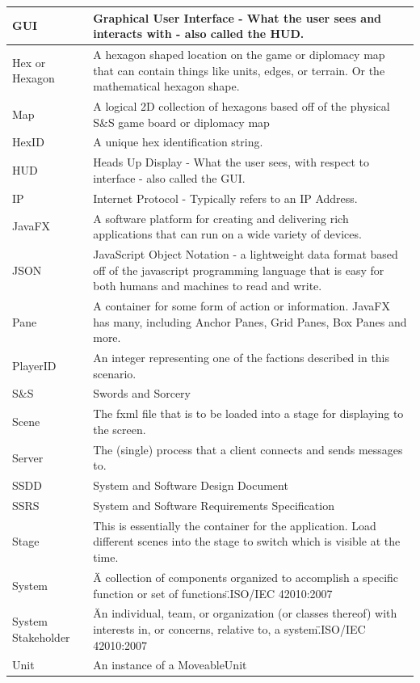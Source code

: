 \documentclass[12pt,a4paper,titlepage]{article}
\begin{document}
{\begin{center}
\begin{tabularx}{\linewidth}{|p{1.5in}|X|}
\hline
GUI & Graphical User Interface - What the user sees and interacts with - also called the HUD.\\
\hline
Hex or Hexagon & A hexagon shaped location on the game or diplomacy map that can contain things like units, edges, or terrain. Or the mathematical hexagon shape.\\
\hline
Map & A logical 2D collection of hexagons based off of the physical S\&S game board or diplomacy map\\
\hline
HexID & A unique hex identification string.\\
\hline
HUD & Heads Up Display - What the user sees, with respect to interface - also called the GUI.\\
\hline
IP & Internet Protocol - Typically refers to an IP Address.\\
\hline
JavaFX & A software platform for creating and delivering rich applications that can run on a wide variety of devices.\\
\hline
JSON & JavaScript Object Notation - a lightweight data format based off of the javascript programming language that is easy for both humans and machines to read and write.\\
\hline
Pane & A container for some form of action or information.  JavaFX has many, including Anchor Panes, Grid Panes, Box Panes and more.\\
\hline
PlayerID & An integer representing one of the factions described in this scenario.\\
\hline
S\&S & Swords and Sorcery\\
\hline
Scene & The fxml file that is to be loaded into a stage for displaying to the screen.\\
\hline
Server & The (single) process that a client connects and sends messages to. \\
\hline
SSDD & System and Software Design Document\\
\hline
SSRS & System and Software Requirements Specification\\
\hline
Stage & This is essentially the container for the application.  Load different scenes into the stage to switch which is visible at the time.\\
\hline
System & \"A collection of components organized to accomplish a specific function or set of functions.\"\space ISO/IEC 42010:2007\\
\hline
System Stakeholder & \"An individual, team, or organization (or classes thereof) with interests in, or concerns, relative to, a system.\"\space ISO/IEC 42010:2007\\
\hline
Unit & An instance of a MoveableUnit\\
\hline
\end{tabularx}
\end{center}
}
\end{document}
